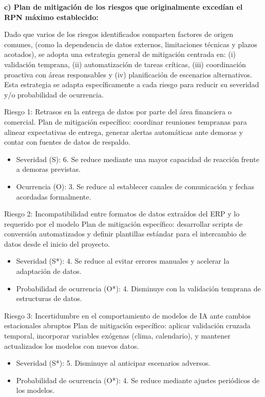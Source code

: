 \documentclass[
11pt, %
]{charter}
\begin{document}
\textbf{c) Plan de mitigación de los riesgos que originalmente excedían el RPN máximo establecido:}

Dado que varios de los riesgos identificados comparten factores de origen comunes, (como la dependencia de datos externos, limitaciones técnicas y plazos acotados), se adopta una estrategia general de mitigación centrada en: (i) validación temprana, (ii) automatización de tareas críticas, (iii) coordinación proactiva con áreas responsables y (iv) planificación de escenarios alternativos. Esta estrategia se adapta específicamente a cada riesgo para reducir su severidad y/o probabilidad de ocurrencia.

Riesgo 1: Retrasos en la entrega de datos por parte del área financiera o comercial.
Plan de mitigación específico: coordinar reuniones tempranas para alinear expectativas de entrega, generar alertas automáticas ante demoras y contar con fuentes de datos de respaldo.
\begin{itemize}
	\item Severidad (S):  6. Se reduce  mediante una mayor capacidad de reacción frente a demoras previstas.
	\item Ocurrencia (O): 3. Se reduce al establecer canales de comunicación y fechas acordadas formalmente.
\end{itemize}

Riesgo 2: Incompatibilidad entre formatos de datos extraídos del ERP y lo requerido por el modelo
Plan de mitigación específico: desarrollar scripts de conversión automatizados y definir plantillas estándar para el intercambio de datos desde el inicio del proyecto.
\begin{itemize}
	\item Severidad (S*): 4. Se reduce al evitar errores manuales y acelerar la adaptación de datos.
	\item Probabilidad de ocurrencia (O*): 4. Disminuye con la validación temprana de estructuras de datos.
\end{itemize}

Riesgo 3: Incertidumbre en el comportamiento de modelos de IA ante cambios estacionales abruptos
Plan de mitigación específico: aplicar validación cruzada temporal, incorporar variables exógenas (clima, calendario), y mantener actualizados los modelos con nuevos datos.
\begin{itemize}
	\item Severidad (S*): 5. Disminuye al anticipar escenarios adversos.
	\item Probabilidad de ocurrencia (O*): 4. Se reduce mediante ajustes periódicos de los modelos.
\end{itemize}
\end{document}
